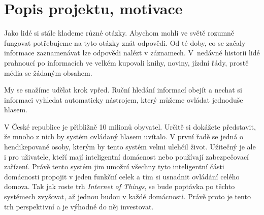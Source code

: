\documentclass[12pt,a4paper]{article}
\begin{document}
\newpage
\pagestyle{plain}     %
\setcounter{page}{1}
\addtolength{\voffset}{-3cm}
\addtolength{\headheight}{2cm}

\pagestyle{fancy}
\lfoot{}
\cfoot{\thepage}
\rfoot{}
\renewcommand{\headrulewidth}{0.4pt}


\section*{Popis projektu, motivace}
Jako lidé si stále klademe různé otázky. Abychom mohli ve světě rozumně fungovat potřebujeme na tyto otázky znát odpovědi. Od té doby, co se začaly informace zaznamenávat lze odpovědi nalézt v záznamech. V~nedávné historii lidé prahnoucí po informacích ve velkém kupovali knihy, noviny, jízdní řády, prostě média se žádaným obsahem. 

My se snažíme udělat krok vpřed. Ruční hledání informací obejít a nechat si informaci vyhledat automaticky nástrojem, který můžeme ovládat jednoduše hlasem.

V České republice je přibližně 10 milionů obyvatel. Určitě si dokážete představit, že mnoho z nich by systém ovládaný hlasem uvítalo. V první řadě se jedná o hendikepované osoby, kterým by tento systém velmi ulehčil život. Užitečný je ale i pro uživatele, kteří mají inteligentní domácnost nebo používají zabezpečovací zařízení. Právě tento systém jim umožní všechny tyto inteligentní části domácnosti propojit v jeden funkční celek a tím si usnadnit ovládání celého domova. Tak jak roste trh \textit{Internet of Things}, se bude poptávka po těchto systémech zvyšovat, až jednou budou v každé domácnosti. Právě proto je tento trh perspektivní a je výhodné do něj investovat.
\end{document}
